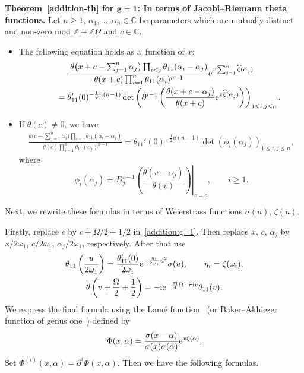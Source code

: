 \documentclass[10pt,a4paper]{amsart}
\numberwithin{equation}{section}
\theoremstyle{definition}
\begin{document}
{\bf Theorem~\ref{addition-th} for $\boldsymbol{ g=1}$: In terms of Jacobi--Riemann theta functions.}
Let $n\geq 1$, $\alpha_1,\dots ,\alpha_n \in \mathbb{C}$ be parameters which are mutually distinct and non-zero mod $\mathbb{Z}+\mathbb{Z}\Omega$ and $c\in \mathbb{C}$.
\begin{itemize}
\item[(1)] The following equation holds as a~function of $x$:
\begin{gather}
\frac{\theta\bigl(x+c-\sum_{j=1}^n \alpha_j\bigr)\prod_{i<j}\theta_{11}(\alpha_i-\alpha_j)}
{\theta(x+c)\prod_{i=1}^n\theta_{11}(\alpha_i)^{n-1}}
{\rm e}^{x\sum_{j=1}^n\widehat{\zeta}(\alpha_j)}\nonumber\\
\qquad=
\theta_{11}'(0)^{-\frac{1}{2}n(n-1)}
\det\left(\partial^{i-1}\left(\frac{\theta(x+c-\alpha_j)}{\theta(x+c)}
{\rm e}^{x\widehat{\zeta}(\alpha_j)}\right)\right)_{1\leq i,j\leq n}.
\label{addition:g=1}
\end{gather}


\item[(2)] If $\theta(c)\neq 0$, we have
\begin{gather*}
\frac{\theta\bigl(c-\sum_{j=1}^n \alpha_j\bigr)\prod_{i<j}\theta_{11}(\alpha_i-\alpha_j)}
{\theta(c)\prod_{i=1}^n\theta_{11}(\alpha_i)^{n-1}}
=
\theta_{11}'(0)^{-\frac{1}{2}n(n-1)}
\det\left(
\phi_i(\alpha_j)
\right)_{1\leq i,j\leq n},
\end{gather*}
where
\[
\phi_i(\alpha_j)=\left.D_{j}^{i-1}\left(\frac{\theta(v-\alpha_j)}{\theta(v)}\right)\right|_{v=c},
\qquad
i\geq 1.
\]
\end{itemize}


Next, we rewrite these formulas in terms of Weierstrass functions $\sigma(u)$, $\zeta(u)$.

Firstly, replace $c$ by $c+\Omega/2+1/2$ in~\eqref{addition:g=1}.
Then replace $x$, $c$, $\alpha_j$ by
$x/2\omega_1$, $c/2\omega_1$, $\alpha_j/2\omega_1$, respectively.
After that use
\begin{gather*}
\theta_{11}\left(\frac{u}{2\omega_1}\right)=
\frac{\theta_{11}'(0)}{2\omega_1}{\rm e}^{-\frac{\eta_1}{2\omega_1}u^2}\sigma(u),
\qquad
\eta_i=\zeta(\omega_i),
\\
\theta\left(v+\frac{\Omega}{2}+\frac{1}{2}\right)=-{\rm i}{\rm e}^{-\frac{\pi{\rm i}}{4}\Omega-\pi{\rm i} v}\theta_{11}(v).
\end{gather*}
We express the final formula using the Lam\'e function~\cite{Whittaker-Watson1902} (or Baker--Akhiezer function
of genus one~\cite{Krichever1977}) defined by
\[
\Phi(x,\alpha)=\frac{\sigma(x-\alpha)}{\sigma(x)\sigma(\alpha)}{\rm e}^{x\zeta(\alpha)}.
\]
Set
$
\Phi^{(i)}(x,\alpha)=\partial^i\Phi(x,\alpha)$.
Then we have the following formulas.
\end{document}
